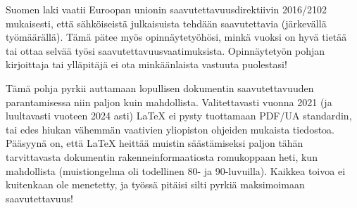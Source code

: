 Suomen laki vaatii Euroopan unionin saavutettavuusdirektiivin 2016/2102 mukaisesti, että sähköiseistä julkaisuista tehdään saavutettavia (järkevällä työmäärällä). Tämä pätee myös opinnäytetyöhösi, minkä vuoksi on hyvä tietää tai ottaa selvää työsi saavutettavuusvaatimuksista. Opinnäytetyön pohjan kirjoittaja tai ylläpitäjä ei ota minkäänlaista vastuuta puolestasi!

Tämä pohja pyrkii auttamaan lopullisen dokumentin saavutettavuuden parantamisessa niin paljon kuin mahdollista. Valitettavasti vuonna 2021 (ja luultavasti vuoteen 2024 asti) \LaTeX{} ei pysty tuottamaan PDF/UA standardin, tai edes hiukan vähemmän vaativien yliopiston ohjeiden mukaista tiedostoa. Pääsyynä on, että \LaTeX{} heittää muistin säästämiseksi paljon tähän tarvittavasta dokumentin rakenneinformaatiosta romukoppaan heti, kun mahdollista (muistiongelma oli todellinen 80- ja 90-luvuilla). Kaikkea toivoa ei kuitenkaan ole menetetty, ja työssä pitäisi silti pyrkiä maksimoimaan saavutettavuus!

